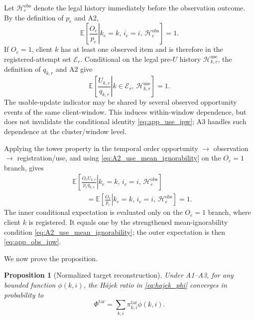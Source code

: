\documentclass[letterpaper,journal]{IEEEtran}
\newtheorem*{proposition*}{Proposition}
\begin{document}
Let $\mathcal{H}^{\mathrm{obs}}_e$ denote the legal history immediately before
the observation outcome.  By the definition of $p_e$ and A2,
\begin{equation}
    \mathbb{E}
    \left[
    \left.
    \frac{O_e}{p_e}
    \right|
    k_e=k,\,
    i_e=i,\,
    \mathcal{H}^{\mathrm{obs}}_e
    \right]
    =1.
    \label{eq:app_obs_ipw}
\end{equation}
If $O_e=1$, client $k$ has at least one observed item and is therefore in the
registered-attempt set $\mathcal{E}_r$.  Conditional on the legal pre-$U$
history $\mathcal{H}^{\mathrm{use}}_{k,r}$, the definition of $q_{k,r}$ and A2
give
\begin{equation}
    \mathbb{E}
    \left[
    \left.
    \frac{U_{k,r}}{q_{k,r}}
    \right|
    k\in\mathcal{E}_r,\,
    \mathcal{H}^{\mathrm{use}}_{k,r}
    \right]
    =1.
    \label{eq:app_use_ipw}
\end{equation}
The usable-update indicator may be shared by several observed opportunity
events of the same client-window.  This induces within-window dependence, but
does not invalidate the conditional identity
\eqref{eq:app_use_ipw}; A3 handles such dependence at the
cluster/window level.

Applying the tower property in the temporal order
opportunity $\rightarrow$ observation $\rightarrow$ registration/use, and using
\eqref{eq:A2_use_mean_ignorability} on the $O_e=1$ branch, gives
\begin{align}
 &\mathbb{E}\!\left[
 \left.
 \frac{O_eU_{k,r}}{p_eq_{k,r}}
 \right|
 k_e=k,\,i_e=i,\,\mathcal{H}^{\mathrm{obs}}_e
 \right]
 \nonumber\\
 &\qquad=
 \mathbb{E}\!\left[
 \left.
 \frac{O_e}{p_e}
 \right|
 k_e=k,\,i_e=i,\,\mathcal{H}^{\mathrm{obs}}_e
 \right]
 =1.
 \label{eq:app_sequential_identity}
\end{align}
The inner conditional expectation is evaluated only on the $O_e=1$ branch,
where client $k$ is registered.  It equals one by the strengthened
mean-ignorability condition \eqref{eq:A2_use_mean_ignorability}; the outer
expectation is then \eqref{eq:app_obs_ipw}.

We now prove the proposition.

\begin{proposition*}[Normalized target reconstruction]
Under A1--A3, for any bounded function $\phi(k,i)$, the H\'ajek ratio in
\eqref{eq:hajek_phi} converges in probability to
\begin{equation}
    \Phi^{\mathrm{tar}}
    =
    \sum_{k,i}
    \pi^{\mathrm{tar}}_{k,i}\phi(k,i).
    \label{eq:app_target_phi}
\end{equation}
\end{proposition*}
\end{document}
